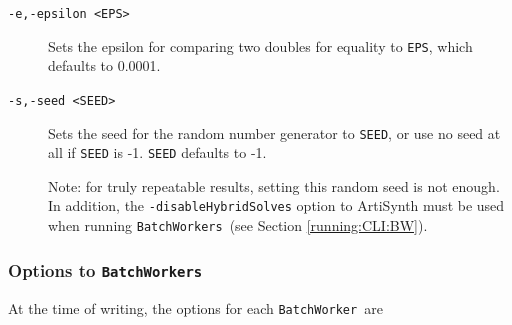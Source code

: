 \documentclass{article}
\newcommand{\BW}{{\tt BatchWorker}}
\newcommand{\BWs}{{\tt BatchWorkers}}
\begin{document}
\begin{description}
\item[{\tt -e,-epsilon <EPS>} ] \mbox{}

Sets the epsilon for comparing two doubles for equality to {\tt EPS}, which defaults to 0.0001.

\item[{\tt -s,-seed <SEED>} ] \mbox{}

Sets the seed for the random number generator to {\tt SEED}, or use no seed at all if {\tt SEED} is -1. {\tt SEED} defaults to -1.

\begin{sideblock}
Note: for truly repeatable results, setting this random seed is not enough. In addition, the {\tt -disableHybridSolves} option to ArtiSynth must be used when running \BWs\ (see Section \ref{running:CLI:BW}).
\end{sideblock}

\end{description}

\subsubsection{Options to \BWs}
\label{running:advanced:BW}

At the time of writing, the options for each \BW\ are
\end{document}
